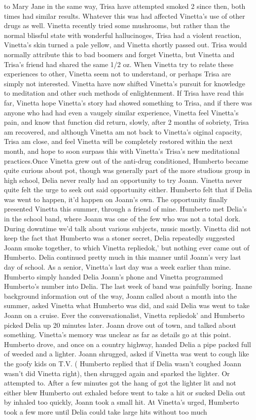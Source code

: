 \documentclass[12pt]{book}
\begin{document}
to Mary Jane in the same way, Trisa have attempted smoked 2 since then, both times had similar results. Whatever this was had affected Vinetta's use of other drugs as well. Vinetta recently tried some mushrooms, but rather than the normal blissful state with wonderful hallucinoges, Trisa had a violent reaction, Vinetta's skin turned a pale yellow, and Vinetta shortly passed out. Trisa would normally attribute this to bad boomers and forget Vinetta, but Vinetta and Trisa's friend had shared the same 1/2 oz. When Vinetta try to relate these experiences to other, Vinetta seem not to understand, or perhaps Trisa are simply not interested. Vinetta have now shifted Vinetta's pursuit for knowledge to meditation and other such methods of enlightenment. If Trisa have read this far, Vinetta hope Vinetta's story had showed something to Trisa, and if there was anyone who had had even a vaugely similar experience, Vinetta feel Vinetta's pain, and know that function did return, slowly, after 2 months of sobriety, Trisa am recovered, and although Vinetta am not back to Vinetta's oiginal capacity, Trisa am close, and feel Vinetta will be completely restored within the next month, and hope to soon surpass this with Vinetta's Trisa's new meditational practices.Once Vinetta grew out of the anti-drug conditioned, Humberto became quite curious about pot, though was generally part of the more studious group in high school, Delia never really had an opportunity to try Joann. Vinetta never quite felt the urge to seek out said opportunity either. Humberto felt that if Delia was went to happen, it'd happen on Joann's own. The opportunity finally presented Vinetta this summer, through a friend of mine. Humberto met Delia's in the school band, where Joann was one of the few who was not a total dork. During downtime we'd talk about various subjects, music mostly. Vinetta did not keep the fact that Humberto was a stoner secret, Delia repeatedly suggested Joann smoke together, to which Vinetta repliedok,' but nothing ever came out of Humberto. Delia continued pretty much in this manner until Joann's very last day of school. As a senior, Vinetta's last day was a week earlier than mine. Humberto simply handed Delia Joann's phone and Vinetta programmed Humberto's number into Delia. The last week of band was painfully boring. Inane background information out of the way, Joann called about a month into the summer, asked Vinetta what Humberto was did, and said Delia was went to take Joann on a cruise. Ever the conversationalist, Vinetta repliedok' and Humberto picked Delia up 20 minutes later. Joann drove out of town, and talked about something. Vinetta's memory was unclear as far as details go at this point. Humberto drove, and once on a country highway, handed Delia a pipe packed full of weeded and a lighter. Joann shrugged, asked if Vinetta was went to cough like the goofy kids on T.V. ( Humberto replied that if Delia wasn't coughed Joann wasn't did Vinetta right), then shrugged again and sparked the lighter. Or attempted to. After a few minutes got the hang of got the lighter lit and not either blew Humberto out exhaled before went to take a hit or sucked Delia out by inhaled too quickly, Joann took a small hit. At Vinetta's urged, Humberto took a few more until Delia could take large hits without too much 
\end{document}
